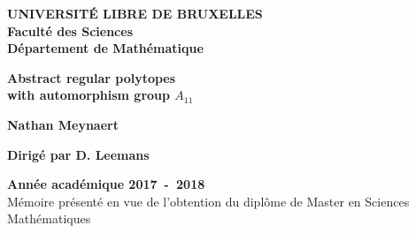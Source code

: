 \begin{titlepage}

  \centering

  \textbf{UNIVERSITÉ LIBRE DE BRUXELLES}\\
  \textbf{Faculté des Sciences}\\
  \textbf{Département de Mathématique}

  \vfill

  \textbf{\Large Abstract regular polytopes\\ with automorphism group $A_{11}$}

  \vfill

  \textbf{\Large Nathan Meynaert}

  \vfill

  \textbf{Dirigé par D. Leemans}

  \vfill

  \textbf{Année académique 2017~-~2018}\\
  Mémoire présenté en vue de l'obtention du diplôme de Master en Sciences Mathématiques

\end{titlepage}
